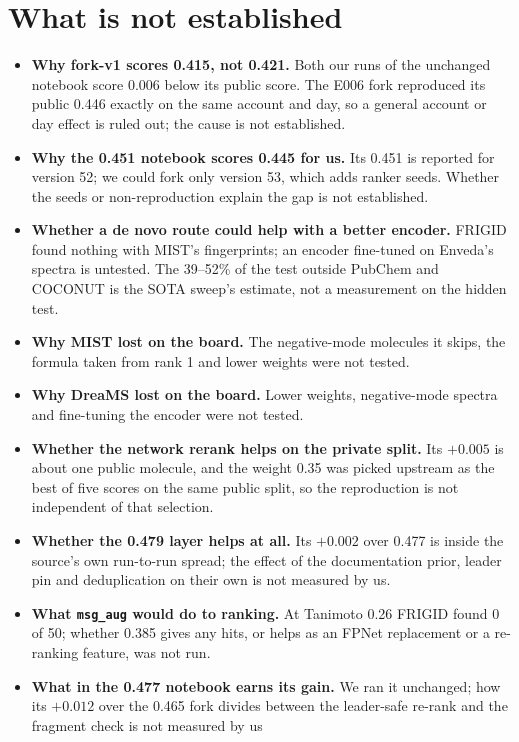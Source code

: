 \documentclass[11pt]{article}
\begin{document}
\section{What is not established}
\begin{itemize}
  \item \textbf{Why fork-v1 scores 0.415, not 0.421.} Both our runs of the unchanged notebook score
    0.006 below its public score. The E006 fork reproduced its public 0.446 exactly on the same account
    and day, so a general account or day effect is ruled out; the cause is not established.
  \item \textbf{Why the 0.451 notebook scores 0.445 for us.} Its 0.451 is reported for version 52;
    we could fork only version 53, which adds ranker seeds. Whether the seeds or non-reproduction
    explain the gap is not established.
  \item \textbf{Whether a de novo route could help with a better encoder.} FRIGID found nothing with
    MIST's fingerprints; an encoder fine-tuned on Enveda's spectra is untested. The 39--52\% of the test
    outside PubChem and COCONUT is the SOTA sweep's estimate, not a measurement on the hidden test.
  \item \textbf{Why MIST lost on the board.} The negative-mode molecules it skips, the formula taken from rank 1 and
    lower weights were not tested.
  \item \textbf{Why DreaMS lost on the board.} Lower weights, negative-mode spectra and fine-tuning the encoder were
    not tested.
  \item \textbf{Whether the network rerank helps on the private split.} Its $+0.005$ is about one public molecule,
    and the weight 0.35 was picked upstream as the best of five scores on the same public split, so the reproduction is
    not independent of that selection.
  \item \textbf{Whether the 0.479 layer helps at all.} Its $+0.002$ over 0.477 is inside the source's own
    run-to-run spread; the effect of the documentation prior, leader pin and deduplication on their own is not
    measured by us.
  \item \textbf{What \texttt{msg\_aug} would do to ranking.} At Tanimoto 0.26 FRIGID found 0 of 50; whether 0.385
    gives any hits, or helps as an FPNet replacement or a re-ranking feature, was not run.
  \item \textbf{What in the 0.477 notebook earns its gain.} We ran it unchanged; how its $+0.012$ over
    the 0.465 fork divides between the leader-safe re-rank and the fragment check is not measured by us

\end{itemize}
\end{document}

